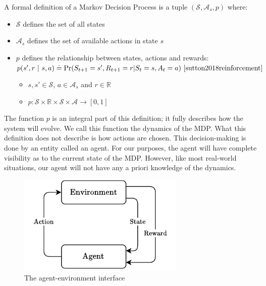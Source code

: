 \documentclass[]{final_report}
\begin{document}
A formal definition of a Markov Decision Process is a tuple $(\mathcal{S},\mathcal{A}_s,p)$ where:
\begin{itemize}
  \item $\mathcal{S}$ defines the set of all states
  \item $\mathcal{A}_s$ defines the set of available actions in state $s$
  \item $p$ defines the relationship between states, actions and rewards: \\
        $p(s',r\ |\ s,a) \doteq \Pr(S_{t+1} = s', R_{t+1} = r | S_t = s, A_t = a)~\cite{sutton2018reinforcement}$
        \begin{itemize}
          \item $s, s' \in \mathcal{S}$, $a \in \mathcal{A}_s$ and $r \in \mathbb{R}$
          \item $p: \mathcal{S} \times \mathbb{R} \times \mathcal{S} \times \mathcal{A} \rightarrow [0,1]$
        \end{itemize}
\end{itemize}

The function $p$ is an integral part of this definition; it fully describes how the system will evolve. We call this function the dynamics of the MDP. What this definition does not describe is how actions are chosen. This decision-making is done by an entity called an agent. For our purposes, the agent will have complete visibility as to the current state of the MDP. However, like most real-world situations, our agent will not have any a priori knowledge of the dynamics. 

\begin{figure}[H]
  \centering
  
  \includegraphics[width=8cm]{agent-enviroment-2}
  
  \caption{\label{fig:agent-enviroment} The agent-environment interface}
\end{figure}

\end{document}
